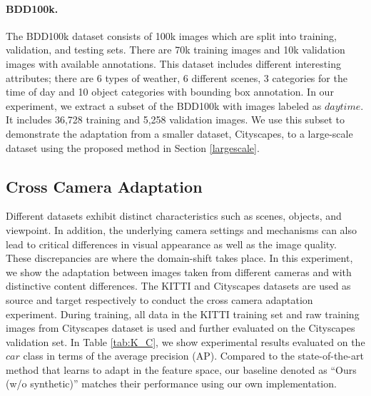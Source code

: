 \documentclass[10pt,twocolumn,letterpaper]{article}
\begin{document}
\vspace{-4mm}\paragraph{BDD100k.} 
The BDD100k dataset \cite{Yu2018BDD100KAD} consists of 100k images which are split into training, validation, and testing sets.
There are 70k training images and 10k validation images with available annotations.
This dataset includes different interesting attributes; there are 6 types of weather, 6 different scenes, 3 categories for the time of day and 10 object categories with bounding box annotation.
In our experiment, we extract a subset of the BDD100k with images labeled as $daytime$.
It includes 36,728 training and 5,258 validation images.
We use this subset to demonstrate the adaptation from a smaller dataset, Cityscapes, to a large-scale dataset using the proposed method in Section \ref{largescale}.


\subsection{Cross Camera Adaptation} \label{K_C}
Different datasets exhibit distinct characteristics such as scenes, objects, and viewpoint.
In addition, the underlying camera settings and mechanisms can also lead to critical differences in visual appearance as well as the image quality.
These discrepancies are where the domain-shift takes place.
In this experiment, we show the adaptation between images taken from different cameras and with distinctive content differences.
The KITTI \cite{Geiger2012CVPR} and Cityscapes \cite{Cordts2016Cityscapes} datasets are used as source and target respectively to conduct the cross camera adaptation experiment.
During training, all data in the KITTI training set and raw training images from Cityscapes dataset is used and further evaluated on the Cityscapes validation set.
In Table \ref{tab:K_C}, we show experimental results evaluated on the $car$ class in terms of the average precision (AP).
Compared to the state-of-the-art method \cite{chen2018domain} that learns to adapt in the feature space, our baseline denoted as ``Ours (w/o synthetic)'' matches their performance using our own implementation.
\end{document}
